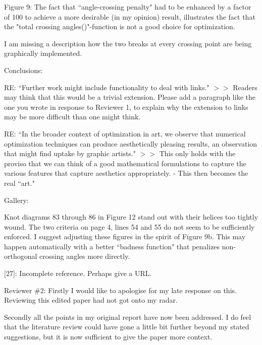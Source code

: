 \documentclass[12pt]{article}
\begin{document}
Figure 9: The fact that ``angle-crossing penalty" had to be enhanced by
a factor of 100 to achieve a more desirable (in my opinion) result,
illustrates the fact that the "total crossing angles()"-function is
not a good choice for optimization.

I am missing a description how the two breaks at every crossing point
are being graphically implemented.

Conclusions:

RE: ``Further work might include functionality to deal
with links."  $>>$ Readers may think that this would be a trivial
extension.  Please add a paragraph like the one you wrote in response
to Reviewer 1, to explain why the extension to links may be more
difficult than one might think.

RE: ``In the broader context of optimization in art, we observe that
numerical optimization techniques can produce aesthetically pleasing
results, an observation that might find uptake by graphic artists."
$>>$ This only holds with the proviso that we can think of a good
mathematical formulations to capture the various features that capture
aesthetics appropriately.  - This then becomes the real ``art."

Gallery:

Knot diagrams 83 through 86 in Figure 12 stand out with their helices
too tightly wound.  The two criteria on page 4, lines 54 and 55 do not
seem to be sufficiently enforced.  I suggest adjusting these figures
in the spirit of Figure 9b.  This may happen automatically with a
better ``badness function" that penalizes non-orthogonal crossing
angles more directly.

[27]:  Incomplete reference.  Perhaps give a URL.



Reviewer \#2: Firstly I would like to apologise for my late response on
this. Reviewing this edited paper had not got onto my radar.

Secondly all the points in my original report have now been
addressed. I do feel that the literature review could have gone a
little bit further beyond my stated suggestions, but it is now
sufficient to give the paper more context.
\end{document}
